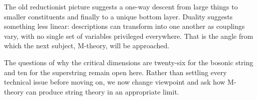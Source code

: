 The old reductionist picture suggests a one-way descent from large things to
smaller constituents and finally to a unique bottom layer. Duality suggests
something less linear: descriptions can transform into one another as
couplings vary, with no single set of variables privileged everywhere. That
is the angle from which the next subject, M-theory, will be approached.

The questions of why the critical dimensions are twenty-six for the bosonic
string and ten for the superstring remain open here. Rather than settling
every technical issue before moving on, we now change viewpoint and ask how
M-theory can produce string theory in an appropriate limit.
